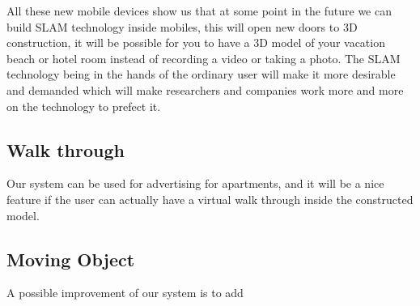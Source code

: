 All these new mobile devices show us that at some point in the future we can build SLAM technology inside mobiles, this will open new doors to 3D construction, it will be possible for you to have a 3D model of your vacation beach or hotel room instead of recording a video or taking a photo. The SLAM technology being in the hands of the ordinary user will make it more desirable and demanded which will make researchers and companies work more and more on the technology to prefect it.


\subsection{Walk through}

Our system can be used for advertising for apartments, and it will be a nice feature if the user can actually have a virtual walk through inside the constructed model.

\subsection{Moving Object}

A possible improvement of our system is to add 
